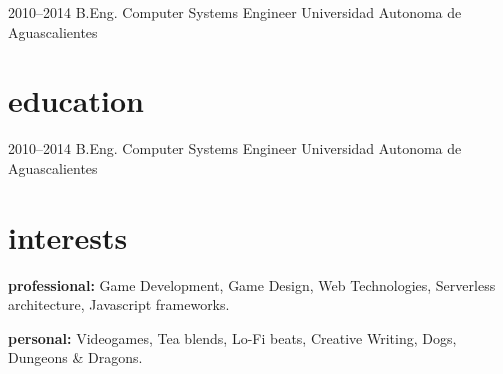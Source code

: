 \documentclass[]{cv-style}          %
\begin{document}
\begin{entrylist}
\entry
{2010--2014}
{B.Eng. {\normalfont Computer Systems Engineer }}
{Universidad Autonoma de Aguascalientes}
{\vspace{-0.3cm}}

\end{entrylist}





\section{education}

\begin{entrylist}
\entry
{2010--2014}
{B.Eng. {\normalfont Computer Systems Engineer }}
{Universidad Autonoma de Aguascalientes}
{\vspace{-0.3cm}}

\end{entrylist}




\section{interests}
  \vspace{-0.2cm}

\textbf{professional:} {Game Development, Game Design, Web Technologies, Serverless architecture, Javascript frameworks.} 

\textbf{personal:} {Videogames, Tea blends, Lo-Fi beats, Creative Writing, Dogs, Dungeons \& Dragons.}

\end{document}
